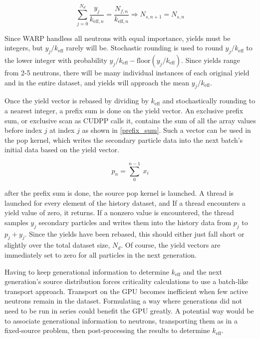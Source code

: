 \begin{equation}
\label{k_eff_rebase}
\sum_{j=0}^{N_d}  \frac{y_j }{k_{\mathrm{eff},n}} = \frac{N_{f,n}}{k_{\mathrm{eff},n}} \Rightarrow N_{s,n+1} = N_{s,n}
\end{equation}

Since WARP handless all neutrons with equal importance, yields must be integers, but $y_j/k_\mathrm{eff}$ rarely will be.  Stochastic rounding is used to round $y_j/k_\mathrm{eff}$ to the lower integer with probability $y_j/k_\mathrm{eff} - \mathrm{floor}(y_j/k_\mathrm{eff})$.  Since yields range from 2-5 neutrons, there will be many individual instances of each original yield and in the entire dataset, and yields will approach the mean $y_j/k_\mathrm{eff}$.

Once the yield vector is rebased by dividing by $k_\mathrm{eff}$ and stochastically rounding to a nearest integer, a prefix sum is done on the yield vector.  An exclusive prefix sum, or exclusive scan as CUDPP calls it, contains the sum of all the array values before index $j$ at index $j$ as shown in \eqref{prefix_sum}.  Such a vector can be used in the pop kernel, which writes the secondary particle data into the next batch's initial data based on the yield vector.

\begin{equation}
p_n = \sum_0^{n-1} \: x_i
\label{prefix_sum}
\end{equation}

after the prefix sum is done, the source pop kernel is launched.  A thread is launched for every element of the history dataset, and If a thread encounters a yield value of zero, it returns.  If a nonzero value is encountered, the thread samples $y_j$ secondary particles and writes them into the history data from $p_j$ to $p_j+y_j$.  Since the yields have been rebased, this should either just fall short or slightly over the total dataset size, $N_d$.  Of course, the yield vectors are immediately set to zero for all particles in the next generation.

Having to keep generational information to determine $k_\mathrm{eff}$ and the next generation's source distribution forces criticality calculations to use a batch-like transport approach.  Transport on the GPU becomes inefficient when few active neutrons remain in the dataset.  Formulating a way where generations did not need to be run in series could benefit the GPU greatly.  A potential way would be to associate generational information to neutrons, transporting them as in a fixed-source problem, then post-processing the results to determine $k_\mathrm{eff}$. 

